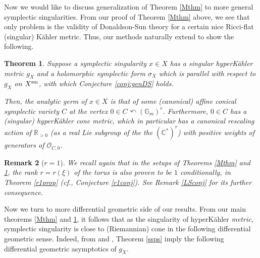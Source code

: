 \documentclass[12pt,a4paper]{amsart}
\newtheorem{Thm}{Theorem}[section]
\newtheorem{Rem}[Thm]{Remark}
\theoremstyle{remark}
\theoremstyle{definition}
\def\R{\mathbb{R}}
\def\C{\mathbb{C}}
\begin{document}

\vspace{3mm}
Now we would like to discuss generalization of 
Theorem \ref{Mthm} to more general symplectic 
singularities. 
From our proof of Theorem \ref{Mthm} above, 
we see that only problem is 
the validity of Donaldson-Sun theory for 
a certain nice Ricci-flat (singular) K\"ahler metric. 
Thus, our methods naturally extend to show the following. 

\begin{Thm}\label{Mthm2}
Suppose a symplectic singularity 
$x\in X$ has 
a singular hyperK\"ahler metric $g_X$ and 
a holomorphic symplectic form $\sigma_X$ which is 
parallel with respect to $g_X$ on $X^{\rm sm}$, 
with which Conjecture \ref{conj:genDS} holds. 

Then, the analytic germ of $x\in X$ is that of some 
(canonical) 
affine conical symplectic variety $C$ at the vertex $0\in C\curvearrowleft (\mathbb{G}_m)^r$. 
Furthermore, $0\in C$ has a (singular) hyperK\"ahler cone  metric, %
which in particular has 
a canonical rescaling action of 
$\R_{>0}$ (as a real Lie subgroup of the the $(\C^*)^r$) with positive weights 
of generators of $\mathcal{O}_{C,0}$. 
\end{Thm}

\begin{Rem}[$r=1$]
We recall again that in the setups of Theorems \ref{Mthm} and \ref{Mthm2}, 
the rank $r=r(\xi)$ of the torus is also proven to be $1$ conditionally, 
in Theorem \ref{r1prop} (cf., Conjecture \ref{r1conj}). 
See Remark \ref{LSconj} for its further consequence. 
\end{Rem}

Now we turn to more differential geometric side of our results. 
From our main theorems \ref{Mthm} and \ref{Mthm2}, it follows that 
as the singularity of hyperK\"ahler {\it metric}, 
symplectic singularity is close to (Riemannian) 
cone in the following differential geometric sense. 
Indeed, from \cite[1.1]{ChiuSzek} and \cite[1.2, 1.4]{Zha24}, 
Theorem \ref{ssps} 
imply the following differential geometric asymptotics of $g_X$. 
\end{document}
